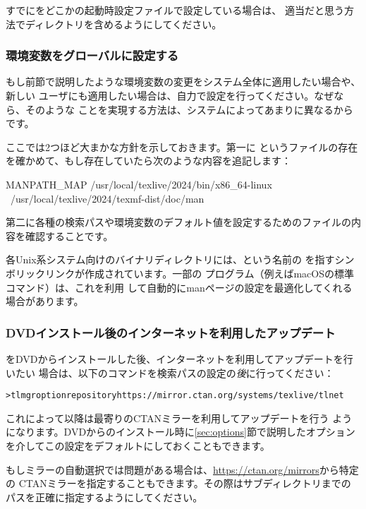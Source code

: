 \documentclass[uplatex,dvipdfmx,12pt,tombow]{jsarticle}
\begin{document}
すでにをどこかの起動時設定ファイルで設定している場合は、
適当だと思う方法で\TL ディレクトリを含めるようにしてください。

\subsubsection{環境変数をグローバルに設定する}
\label{sec:envglobal}

もし前節で説明したような環境変数の変更をシステム全体に適用したい場合や、新しい
ユーザにも適用したい場合は、自力で設定を行ってください。なぜなら、そのような
ことを実現する方法は、システムによってあまりに異なるからです。

ここでは2つほど大まかな方針を示しておきます。第一に%
というファイルの存在を確かめて、もし存在していたら次のような内容を追記します：
%
\begin{sverbatim}
MANPATH_MAP /usr/local/texlive/2024/bin/x86_64-linux \
            /usr/local/texlive/2024/texmf-dist/doc/man
\end{sverbatim}
%
第二に各種の検索パスや環境変数のデフォルト値を設定するためのファイルの内容を確認することです。

各Unix系システム向けのバイナリディレクトリには、という名前の
を指すシンボリックリンクが作成されています。一部の
プログラム（例えばmacOSの標準コマンド）は、これを利用
して自動的にmanページの設定を最適化してくれる場合があります。

\subsubsection{DVDインストール後のインターネットを利用したアップデート}
\label{sec:dvd-install-net-updates}

\TL をDVDからインストールした後、インターネットを利用してアップデートを行いたい
場合は、以下のコマンドを検索パスの設定の\emph{後}に行ってください：
%
\begin{alltt}
> tlmgr option repository https://mirror.ctan.org/systems/texlive/tlnet
\end{alltt}
%
これによって以降は最寄りのCTANミラーを利用してアップデートを行う
ようになります。DVDからのインストール時に\ref{sec:options}節で説明したオプション
を介してこの設定をデフォルトにしておくこともできます。

もしミラーの自動選択では問題がある場合は、\url{https://ctan.org/mirrors}から特定の
CTANミラーを指定することもできます。その際はサブディレクトリまでの
パスを正確に指定するようにしてください。
\end{document}
